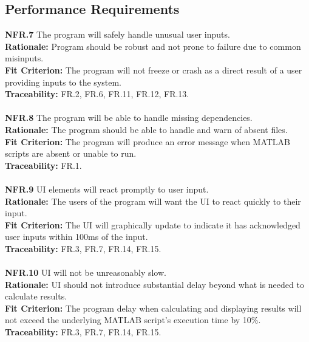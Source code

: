 \documentclass[12pt]{article}
\begin{document}
\subsection{Performance Requirements}

  \textbf{NFR.7} The program will safely handle unusual user inputs.\\
  \textbf{Rationale:} Program should be robust and not prone to failure due to common misinputs.\\
  \textbf{Fit Criterion:} The program will not freeze or crash as a direct result of a user providing inputs to the system.\\
  \textbf{Traceability:} FR.2, FR.6, FR.11, FR.12, FR.13.\\\\

  \noindent\textbf{NFR.8} The program will be able to handle missing dependencies.\\
  \textbf{Rationale:} The program should be able to handle and warn of absent files.\\
  \textbf{Fit Criterion:} The program will produce an error message when MATLAB scripts are absent or unable to run.\\
  \textbf{Traceability:} FR.1.\\\\

  \noindent\textbf{NFR.9} UI elements will react promptly to user input.\\
  \textbf{Rationale:} The users of the program will want the UI to react quickly to their input.\\
  \textbf{Fit Criterion:} The UI will graphically update to indicate it has acknowledged user inputs within 100ms of the input.\\
  \textbf{Traceability:} FR.3, FR.7, FR.14, FR.15.\\\\

  \noindent\textbf{NFR.10} UI will not be unreasonably slow.\\
  \textbf{Rationale:} UI should not introduce substantial delay beyond what is needed to calculate results.\\
  \textbf{Fit Criterion:} The program delay when calculating and displaying results will not exceed the underlying MATLAB script's execution time by 10\%.\\
  \textbf{Traceability:} FR.3, FR.7, FR.14, FR.15.\\\\
\end{document}
